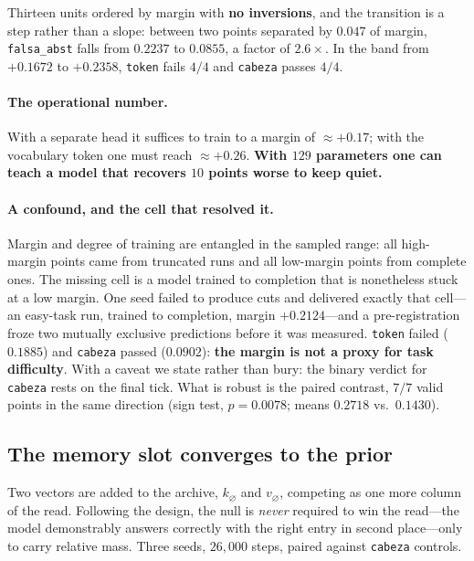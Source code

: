 \documentclass[11pt,a4paper]{article}
\begin{document}
Thirteen units ordered by margin with \textbf{no inversions}, and the transition is a step rather
than a slope: between two points separated by $0.047$ of margin, \texttt{falsa\_abst} falls from
$0.2237$ to $0.0855$, a factor of $2.6\times$. In the band from $+0.1672$ to $+0.2358$,
\texttt{token} fails $4/4$ and \texttt{cabeza} passes $4/4$.

\paragraph{The operational number.} With a separate head it suffices to train to a margin of
$\approx +0.17$; with the vocabulary token one must reach $\approx +0.26$. \textbf{With $129$
parameters one can teach a model that recovers $10$ points worse to keep quiet.}

\paragraph{A confound, and the cell that resolved it.} Margin and degree of training are entangled
in the sampled range: all high-margin points came from truncated runs and all low-margin points from
complete ones. The missing cell is a model trained to completion that is nonetheless stuck at a low
margin. One seed failed to produce cuts and delivered exactly that cell---an easy-task run, trained
to completion, margin $+0.2124$---and a pre-registration froze two mutually exclusive predictions
before it was measured. \texttt{token} failed ($0.1885$) and \texttt{cabeza} passed ($0.0902$):
\textbf{the margin is not a proxy for task difficulty}. With a caveat we state rather than bury: the
binary verdict for \texttt{cabeza} rests on the final tick. What is robust is the paired contrast,
$7/7$ valid points in the same direction (sign test, $p = 0.0078$; means $0.2718$ vs.\ $0.1430$).

\subsection{The memory slot converges to the prior}
\label{sec:slot}

Two vectors are added to the archive, $k_{\varnothing}$ and $v_{\varnothing}$, competing as one more
column of the read. Following the design, the null is \emph{never} required to win the read---the
model demonstrably answers correctly with the right entry in second place---only to carry relative
mass. Three seeds, $26{,}000$ steps, paired against \texttt{cabeza} controls.
\end{document}

